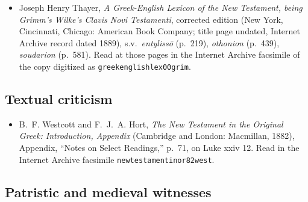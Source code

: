 {\fontsize{8.6}{9.6}\selectfont
\begin{itemize}[itemsep=0pt,parsep=0pt,topsep=0.05em]
\item Joseph Henry Thayer, \emph{A Greek-English Lexicon of the New Testament,
being Grimm's Wilke's Clavis Novi Testamenti}, corrected edition (New York,
Cincinnati, Chicago: American Book Company; title page undated, Internet Archive
record dated 1889), s.v.\ \emph{entyliss\=o} (p.~219), \emph{othonion}
(p.~439), \emph{soudarion} (p.~581). Read at those pages in the Internet Archive
facsimile of the copy digitized as \texttt{greekenglishlex00grim}.
\end{itemize}}

\subsection*{Textual criticism}

{\fontsize{8.6}{9.6}\selectfont
\begin{itemize}[itemsep=0pt,parsep=0pt,topsep=0.05em]
\item B.~F. Westcott and F.~J.~A. Hort, \emph{The New Testament in the Original
Greek: Introduction, Appendix} (Cambridge and London: Macmillan, 1882),
Appendix, ``Notes on Select Readings,'' p.~71, on Luke xxiv 12. Read in the
Internet Archive facsimile \texttt{newtestamentinor82west}.
\end{itemize}}

\subsection*{Patristic and medieval witnesses}

